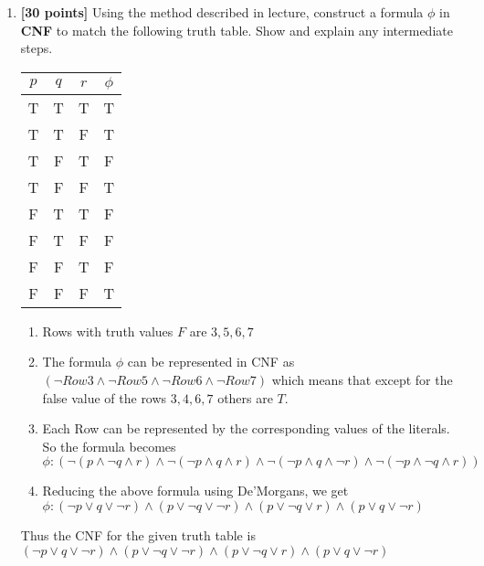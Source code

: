 \documentclass{article}
\begin{document}
\begin{enumerate}
\item \textbf{[30 points]} Using the method described in lecture,
  construct a formula $\phi$ in \textbf{CNF} to match the following
  truth table.  Show and explain any intermediate steps.
  \begin{center}
    \begin{tabular}{ccc|c}
      $p$ & $q$ & $r$ & $\phi$ \\ \hline
      T & T & T & T\\
      T & T & F & T\\
      T & F & T & F\\
      T & F & F & T\\
      F & T & T & F\\
      F & T & F & F\\
      F & F & T & F\\
      F & F & F & T
    \end{tabular}
  \end{center}
   \begin{answer}
  	\begin{enumerate}
  		\item Rows with truth values $F$ are $3, 5, 6, 7$
  		\item The formula $\phi$ can be represented in CNF as $(\neg Row3 \land
  		\neg Row5 \land \neg Row6 \land \neg Row7)$ which means that except for the
  		false value of the rows $3, 4, 6, 7$ others are $T$.
  		\item Each Row can be represented by the corresponding values of the
  		literals. So the formula becomes $\phi : (\neg (p \land \neg q \land r)
  		\land \neg(\neg p \land q \land r) \land \neg(\neg p \land q \land
  		\neg r) \land \neg(\neg p \land \neg q \land r))$
  		\item Reducing the above formula using De'Morgans, we get $\phi: (\neg
  		p \lor q \lor \neg r) \land ( p \lor \neg q \lor \neg r) \land (p \lor \neg q \lor r) \land (p \lor q \lor \neg r)$
  	\end{enumerate}
  	
  	Thus the CNF for the given truth table is $ (\neg
  		p \lor q \lor \neg r) \land ( p \lor \neg q \lor \neg r) \land (p \lor \neg q \lor r) \land (p \lor q \lor \neg r)$
  	\end{answer}


\end{enumerate}
\end{document}
